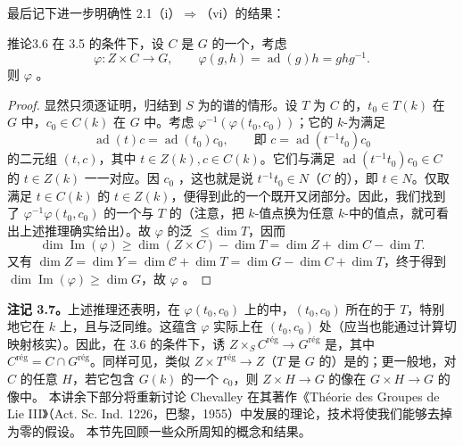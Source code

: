 最后记下进一步明确性 2.1（i）$\Rightarrow$（vi）的结果：
\begin{SGAresult}{推论}{3.6}
在 3.5 的条件下，设 $C$ 是 $G$ 的一个，考虑
\[\varphi:Z\times C\longrightarrow G,\qquad\varphi(g,h)=\operatorname{ad}(g)h=ghg^{-1}.\]
则 $\varphi$ 。
\end{SGAresult}
\begin{proof}
显然只须逐证明，归结到 $S$ 为的谱的情形。设 $T$ 为 $C$ 的，$t_0\in T(k)$ 在 $G$ 中，$c_0\in C(k)$ 在 $G$ 中。考虑 $\varphi^{-1}(\varphi(t_0,c_0))$；它的 $k$-为满足
\[\operatorname{ad}(t)c=\operatorname{ad}(t_0)c_0,\qquad\text{即 }c=\operatorname{ad}(t^{-1}t_0)c_0\]
的二元组 $(t,c)$，其中 $t\in Z(k),c\in C(k)$。它们与满足 $\operatorname{ad}(t^{-1}t_0)c_0\in C$ 的 $t\in Z(k)$ 一一对应。因 $c_0$ ，这也就是说 $t^{-1}t_0\in N$（$C$ 的），即 $t\in N$。仅取满足 $t\in C(k)$ 的 $t\in Z(k)$，便得到此的一个既开又闭部分。因此，我们找到了 $\varphi^{-1}\varphi(t_0,c_0)$ 的一个与 $T$ 的（注意，把 $k$-值点换为任意 $k$-中的值点，就可看出上述推理确实给出）。故 $\varphi$ 的泛 $\leq\dim T$，因而
\[\dim\operatorname{Im}(\varphi)\geq\dim(Z\times C)-\dim T=\dim Z+\dim C-\dim T.\]
又有 $\dim Z=\dim Y=\dim\mathscr C+\dim T=\dim G-\dim C+\dim T$，终于得到 $\dim\operatorname{Im}(\varphi)\geq\dim G$，故 $\varphi$ 。
\end{proof}
\textbf{注记 3.7。}上述推理还表明，在 $\varphi(t_0,c_0)$ 上的中，$(t_0,c_0)$ 所在的于 $T$，特别地它在 $k$ 上，且与泛同维。这蕴含 $\varphi$ 实际上在 $(t_0,c_0)$ 处（应当也能通过计算切映射核实）。因此，在 3.6 的条件下，诱 $Z\times_S C^{\mathrm{r\text{é}g}}\to G^{\mathrm{r\text{é}g}}$ 是，其中 $C^{\mathrm{r\text{é}g}}=C\cap G^{\mathrm{r\text{é}g}}$。同样可见，类似 $Z\times T^{\mathrm{r\text{é}g}}\to Z$（$T$ 是 $G$ 的）是的；更一般地，对 $C$ 的任意 $H$，若它包含 $G(k)$ 的一个 $c_0$，则 $Z\times H\to G$ 的像在 $G\times H\to G$ 的像中。
本讲余下部分将重新讨论 Chevalley 在其著作《Théorie des Groupes de Lie III》（Act. Sc. Ind. 1226，巴黎，1955）中发展的理论，技术将使我们能够去掉为零的假设。
本节先回顾一些众所周知的概念和结果。

